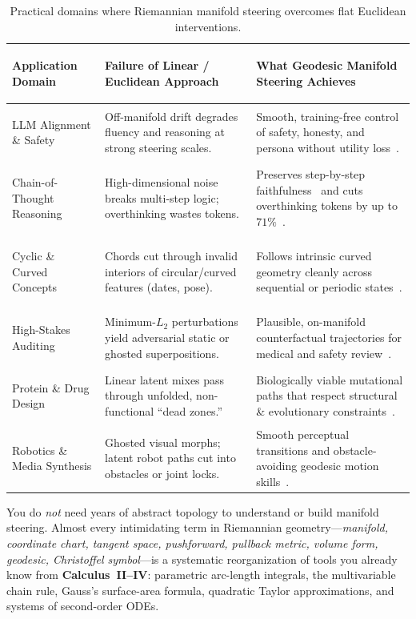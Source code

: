 \documentclass[11pt,a4paper]{article}
\theoremstyle{definition}
\begin{document}
\begin{table}[ht!]
\centering
\footnotesize
\renewcommand{\arraystretch}{1.32}
\begin{tabularx}{\textwidth}{@{} >{\bfseries\raggedright\arraybackslash}p{} >{\raggedright\arraybackslash}p{} Y @{}}
\toprule
Application Domain & \textbf{Failure of Linear / Euclidean Approach} & \textbf{What Geodesic Manifold Steering Achieves} \\
\midrule
LLM Alignment \& Safety & Off-manifold drift degrades fluency and reasoning at strong steering scales. & Smooth, training-free control of safety, honesty, and persona without utility loss~\cite{wurgaft2026manifold,oozeer2026riemannian}. \\
\addlinespace
Chain-of-Thought Reasoning & High-dimensional noise breaks multi-step logic; overthinking wastes tokens. & Preserves step-by-step faithfulness~\cite{kazama2026geosteer} and cuts overthinking tokens by up to $71\%$~\cite{huang2025overthinking}. \\
\addlinespace
Cyclic \& Curved Concepts & Chords cut through invalid interiors of circular/curved features (dates, pose). & Follows intrinsic curved geometry cleanly across sequential or periodic states~\cite{engels2024nonlinear,oozeer2026riemannian}. \\
\addlinespace
High-Stakes Auditing & Minimum-$L_2$ perturbations yield adversarial static or ghosted superpositions. & Plausible, on-manifold counterfactual trajectories for medical and safety review~\cite{arvanitidis2018oddity}. \\
\addlinespace
Protein \& Drug Design & Linear latent mixes pass through unfolded, non-functional ``dead zones.'' & Biologically viable mutational paths that respect structural \& evolutionary constraints~\cite{detlefsen2022protein}. \\
\addlinespace
Robotics \& Media Synthesis & Ghosted visual morphs; latent robot paths cut into obstacles or joint locks. & Smooth perceptual transitions and obstacle-avoiding geodesic motion skills~\cite{beikmohammadi2021robotics}. \\
\bottomrule
\end{tabularx}
\caption{Practical domains where Riemannian manifold steering overcomes flat Euclidean interventions.}
\label{tab:applications}
\end{table}

\begin{keyidea}
You do \emph{not} need years of abstract topology to understand or build manifold steering. Almost every intimidating term in Riemannian geometry---\emph{manifold, coordinate chart, tangent space, pushforward, pullback metric, volume form, geodesic, Christoffel symbol}---is a systematic reorganization of tools you already know from \textbf{Calculus~II--IV}: parametric arc-length integrals, the multivariable chain rule, Gauss's surface-area formula, quadratic Taylor approximations, and systems of second-order ODEs.
\end{keyidea}
\end{document}

